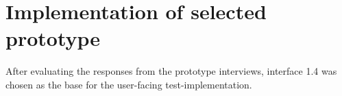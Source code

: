 \documentclass[nofilelist,dvipsnames]{cslthse-msc}
\begin{document}
{%
%
%
%
%

    \section{Implementation of selected prototype}

      After evaluating the responses from the prototype interviews, interface
      1.4 was chosen as the base for the user-facing test-implementation.

}
\end{document}
